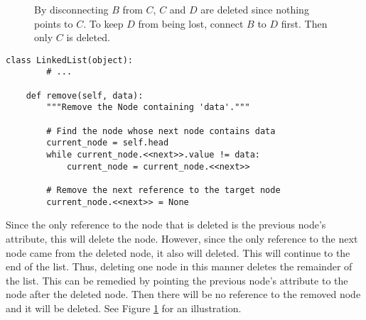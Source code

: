 \begin{figure}
\caption{By disconnecting $B$ from $C$, $C$ and $D$ are deleted since nothing points to $C$. To keep $D$ from being lost, connect $B$ to $D$ first. Then only $C$ is deleted.}
\label{fig:remove}
\end{figure}

\begin{lstlisting}
class LinkedList(object):
		# ...

	def remove(self, data):
		"""Remove the Node containing 'data'."""

		# Find the node whose next node contains data
		current_node = self.head
		while current_node.<<next>>.value != data:
			current_node = current_node.<<next>>

		# Remove the next reference to the target node
		current_node.<<next>> = None
\end{lstlisting}

Since the only reference to the node that is deleted is the previous node's  attribute, this will delete the node.
However, since the only reference to the next node came from the deleted node, it also will deleted.
This will continue to the end of the list.
Thus, deleting one node in this manner deletes the remainder of the list.
This can be remedied by pointing the previous node's  attribute to the node after the deleted node.
Then there will be no reference to the removed node and it will be deleted. 
See Figure \ref{fig:remove} for an illustration.

